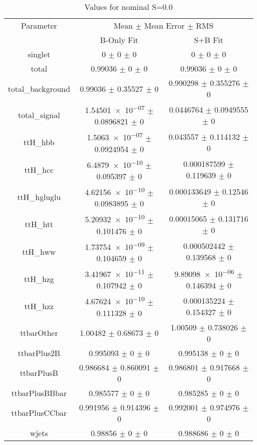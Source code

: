 \begin{table}
\centering
\caption{Values for nominal S=0.0}
\begin{tabular}{ccc}
\toprule
Parameter & \multicolumn{2}{c}{Mean $\pm$ Mean Error $\pm$ RMS}\\
 & B-Only Fit & S+B Fit\\
\midrule
singlet & \num{0} $\pm$ \num{0} $\pm$ \num{0} & \num{0} $\pm$ \num{0} $\pm$ \num{0}\\
total & \num{0.99036} $\pm$ \num{0} $\pm$ \num{0} & \num{0.99036} $\pm$ \num{0} $\pm$ \num{0}\\
total\_background & \num{0.99036} $\pm$ \num{0.35527} $\pm$ \num{0} & \num{0.990298} $\pm$ \num{0.355276} $\pm$ \num{0}\\
total\_signal & \num{1.54501e-07} $\pm$ \num{0.0896821} $\pm$ \num{0} & \num{0.0446764} $\pm$ \num{0.0949555} $\pm$ \num{0}\\
ttH\_hbb & \num{1.5063e-07} $\pm$ \num{0.0924954} $\pm$ \num{0} & \num{0.043557} $\pm$ \num{0.114132} $\pm$ \num{0}\\
ttH\_hcc & \num{6.4879e-10} $\pm$ \num{0.095397} $\pm$ \num{0} & \num{0.000187599} $\pm$ \num{0.119639} $\pm$ \num{0}\\
ttH\_hgluglu & \num{4.62156e-10} $\pm$ \num{0.0983895} $\pm$ \num{0} & \num{0.000133649} $\pm$ \num{0.12546} $\pm$ \num{0}\\
ttH\_htt & \num{5.20932e-10} $\pm$ \num{0.101476} $\pm$ \num{0} & \num{0.00015065} $\pm$ \num{0.131716} $\pm$ \num{0}\\
ttH\_hww & \num{1.73754e-09} $\pm$ \num{0.104659} $\pm$ \num{0} & \num{0.000502442} $\pm$ \num{0.139568} $\pm$ \num{0}\\
ttH\_hzg & \num{3.41967e-11} $\pm$ \num{0.107942} $\pm$ \num{0} & \num{9.89098e-06} $\pm$ \num{0.146394} $\pm$ \num{0}\\
ttH\_hzz & \num{4.67624e-10} $\pm$ \num{0.111328} $\pm$ \num{0} & \num{0.000135224} $\pm$ \num{0.154327} $\pm$ \num{0}\\
ttbarOther & \num{1.00482} $\pm$ \num{0.68673} $\pm$ \num{0} & \num{1.00509} $\pm$ \num{0.738026} $\pm$ \num{0}\\
ttbarPlus2B & \num{0.995093} $\pm$ \num{0} $\pm$ \num{0} & \num{0.995138} $\pm$ \num{0} $\pm$ \num{0}\\
ttbarPlusB & \num{0.986684} $\pm$ \num{0.860091} $\pm$ \num{0} & \num{0.986801} $\pm$ \num{0.917668} $\pm$ \num{0}\\
ttbarPlusBBbar & \num{0.985577} $\pm$ \num{0} $\pm$ \num{0} & \num{0.985285} $\pm$ \num{0} $\pm$ \num{0}\\
ttbarPlusCCbar & \num{0.991956} $\pm$ \num{0.914396} $\pm$ \num{0} & \num{0.992001} $\pm$ \num{0.974976} $\pm$ \num{0}\\
wjets & \num{0.98856} $\pm$ \num{0} $\pm$ \num{0} & \num{0.988686} $\pm$ \num{0} $\pm$ \num{0}\\
\bottomrule
\end{tabular}
\end{table}
